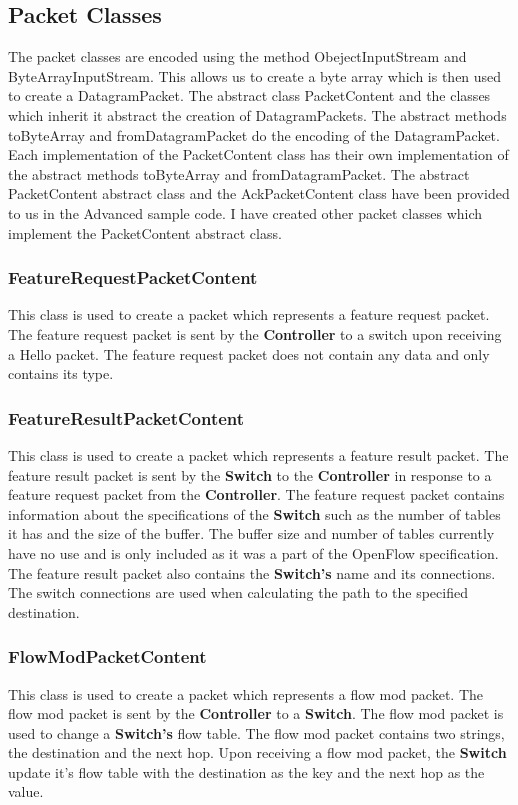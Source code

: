 \documentclass{article}
\begin{document}
\subsection{Packet Classes}
The packet classes are encoded using the method ObejectInputStream and
ByteArrayInputStream. This allows us to create a byte array which is then used
to create a DatagramPacket. The abstract class PacketContent and the classes
which inherit it abstract the creation of DatagramPackets. The abstract
methods toByteArray and fromDatagramPacket do the encoding of the
DatagramPacket. Each implementation of the PacketContent class has their own
implementation of the abstract methods toByteArray and fromDatagramPacket. The
abstract PacketContent abstract class and the AckPacketContent class have been
provided to us in the Advanced sample code. I have created other packet classes
which implement the PacketContent abstract class.

\subsubsection{FeatureRequestPacketContent}
This class is used to create a packet which represents a feature request
packet. The feature request packet is sent by the \textbf{Controller} to a
switch upon receiving a Hello packet. The feature request packet does not
contain any data and only contains its type.

\subsubsection{FeatureResultPacketContent}
This class is used to create a packet which represents a feature result packet.
The feature result packet is sent by the \textbf{Switch} to the
\textbf{Controller} in response to a feature request packet from the
\textbf{Controller}. The feature request packet contains information about the
specifications of the \textbf{Switch} such as the number of tables it has and
the size of the buffer. The buffer size and number of tables currently have no
use and is only included as it was a part of the OpenFlow specification. The
feature result packet also contains the \textbf{Switch's} name and its
connections. The switch connections are used when calculating the path to the
specified destination.

\subsubsection{FlowModPacketContent}
This class is used to create a packet which represents a flow mod packet. The
flow mod packet is sent by the \textbf{Controller} to a \textbf{Switch}. The
flow mod packet is used to change a \textbf{Switch's} flow table. The flow mod
packet contains two strings, the destination and the next hop. Upon receiving a
flow mod packet, the \textbf{Switch} update it's flow table with the destination
as the key and the next hop as the value.
\end{document}
